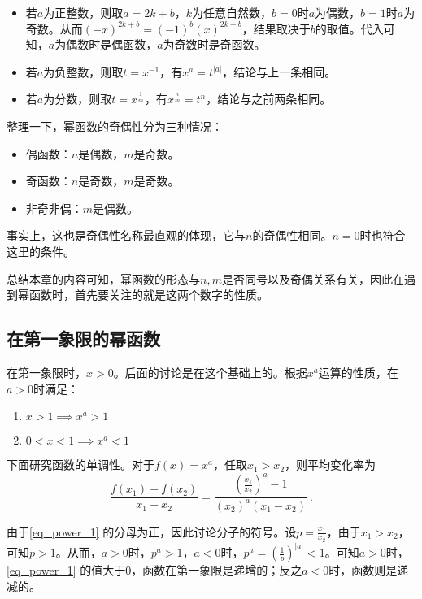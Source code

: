 \begin{itemize}
\item 若$a$为正整数，则取$a=2k+b$，$k$为任意自然数，$b=0$时$a$为偶数，$b=1$时$a$为奇数。从而$(-x)^{2k+b}=(-1)^b(x)^{2k+b}$，结果取决于$b$的取值。代入可知，$a$为偶数时是偶函数，$a$为奇数时是奇函数。
\item 若$a$为负整数，则取$t=x^{-1}$，有$x^a=t^{|a|}$，结论与上一条相同。
\item 若$a$为分数，则取$t=x^\frac{1}{m}$，有$x^\frac{n}{m}=t^{n}$，结论与之前两条相同。
\end{itemize}

整理一下，幂函数的奇偶性分为三种情况：

\begin{itemize}
\item 偶函数：$n$是偶数，$m$是奇数。
\item 奇函数：$n$是奇数，$m$是奇数。
\item 非奇非偶：$m$是偶数。
\end{itemize}

事实上，这也是奇偶性名称最直观的体现，它与$n$的奇偶性相同。$n=0$时也符合这里的条件。

总结本章的内容可知，幂函数的形态与$n,m$是否同号以及奇偶关系有关，因此在遇到幂函数时，首先要关注的就是这两个数字的性质。

\subsection{在第一象限的幂函数}

在第一象限时，$x>0$。后面的讨论是在这个基础上的。根据$x^a$运算的性质，在$a>0$时满足：
\begin{enumerate}
\item $x>1\implies x^a>1$
\item $0<x<1\implies x^a<1$
\end{enumerate}

下面研究函数的单调性。对于$f(x)=x^a$，任取$x_1>x_2$，则平均变化率为
\begin{equation}\label{eq_power_1}
\frac{f(x_1)-f(x_2)}{x_1-x_2}=\frac{\left(\frac{x_1}{x_2}\right)^a-1}{(x_2)^a(x_1-x_2)}~.
\end{equation}

由于\autoref{eq_power_1} 的分母为正，因此讨论分子的符号。设$\displaystyle p=\frac{x_1}{x_2}$，由于$x_1>x_2$，可知$p>1$。从而，$a>0$时，$p^a>1$，$a<0$时，$\displaystyle p^a=\left(\frac{1}{p}\right)^{|a|}<1$。可知$a>0$时，\autoref{eq_power_1} 的值大于$0$，函数在第一象限是递增的；反之$a<0$时，函数则是递减的。

